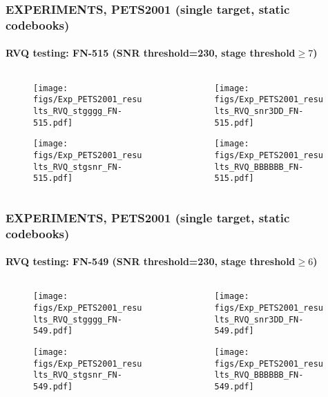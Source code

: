 \begin{frame}
\frametitle{\small EXPERIMENTS, PETS2001 (single target, static codebooks)}
\framesubtitle{RVQ testing: FN-515 (SNR threshold=230, stage threshold$\geq 7$)}
	\begin{changemargin}{-1.35in}{0in}
	\begin{columns}
		\begin{column}{1.5in}			
			\begin{figure}
				\texttt{[image: figs/Exp\_PETS2001\_results\_RVQ\_stgggg\_FN-515.pdf]}
			\end{figure}
			\begin{figure}
				\texttt{[image: figs/Exp\_PETS2001\_results\_RVQ\_stgsnr\_FN-515.pdf]}
			\end{figure}
		\end{column}
		\begin{column}{1.5in}
			\begin{figure}
				\texttt{[image: figs/Exp\_PETS2001\_results\_RVQ\_snr3DD\_FN-515.pdf]}
			\end{figure}
			\begin{figure}
				\texttt{[image: figs/Exp\_PETS2001\_results\_RVQ\_BBBBBB\_FN-515.pdf]}
			\end{figure}
		\end{column}
	\end{columns}
	\end{changemargin}
\end{frame}



\begin{frame}
\frametitle{\small EXPERIMENTS, PETS2001 (single target, static codebooks)}
\framesubtitle{RVQ testing: FN-549 (SNR threshold=230, stage threshold$\geq 6$)}
	\begin{changemargin}{-1.35in}{0in}
	\begin{columns}
		\begin{column}{1.5in}			
			\begin{figure}
				\texttt{[image: figs/Exp\_PETS2001\_results\_RVQ\_stgggg\_FN-549.pdf]}
			\end{figure}
			\begin{figure}
				\texttt{[image: figs/Exp\_PETS2001\_results\_RVQ\_stgsnr\_FN-549.pdf]}
			\end{figure}
		\end{column}
		\begin{column}{1.5in}
			\begin{figure}
				\texttt{[image: figs/Exp\_PETS2001\_results\_RVQ\_snr3DD\_FN-549.pdf]}
			\end{figure}
			\begin{figure}
				\texttt{[image: figs/Exp\_PETS2001\_results\_RVQ\_BBBBBB\_FN-549.pdf]}
			\end{figure}
		\end{column}
	\end{columns}
	\end{changemargin}
\end{frame}


